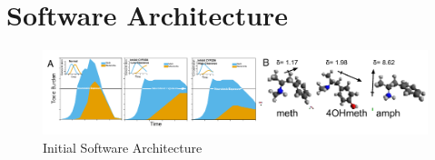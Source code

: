 \chapter{Software Architecture}\label{software_architecture}

\begin{figure}[h] %
       \centering
       \includegraphics[scale = .80]{Figures/Fig2.pdf}
       \caption{\footnotesize Initial Software Architecture}
       \label{fig2}
\end{figure}

